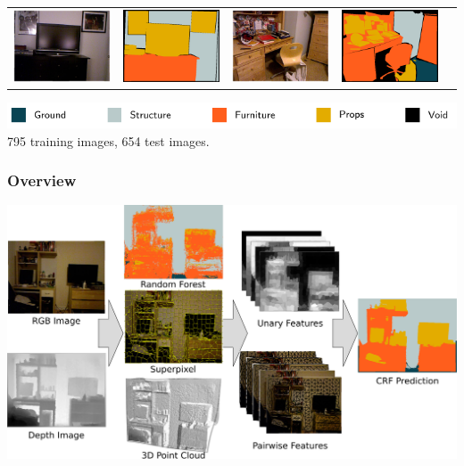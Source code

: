 \documentclass[final,ignorenonframetext,compress]{beamer}
\begin{document}
\begin{frame}
\begin{tabularx}{\linewidth}{@{\extracolsep{\fill}}ccccc}
        \includegraphics[width=.22\textwidth]{images/00191_image.png}&%
        \includegraphics[width=.22\linewidth]{images/00191_gt.png}&
        \includegraphics[width=.22\textwidth]{images/01052_image.png}&%
        \includegraphics[width=.22\linewidth]{images/01052_gt.png}\\

    \end{tabularx}
    \includegraphics[width=\linewidth]{images/legend.pdf}\\
    795 training images, 654 test images.
\end{frame}

\begin{frame}
    \frametitle{Overview}
    \begin{center}
        \includegraphics[width=.9\linewidth]{images/teaser}
    \end{center}
\end{frame}
\end{document}
